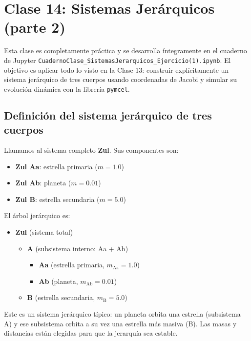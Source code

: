 \chapter{Clase 14: Sistemas Jerárquicos (parte 2)}

Esta clase es completamente práctica y se desarrolla íntegramente en el cuaderno de Jupyter \texttt{CuadernoClase\_SistemasJerarquicos\_Ejercicio(1).ipynb}. El objetivo es aplicar todo lo visto en la Clase 13: construir explícitamente un sistema jerárquico de tres cuerpos usando coordenadas de Jacobi y simular su evolución dinámica con la librería \texttt{pymcel}.

\section{Definición del sistema jerárquico de tres cuerpos}
Llamamos al sistema completo \textbf{Zul}. Sus componentes son:
\begin{itemize}
    \item \textbf{Zul Aa}: estrella primaria (\(m = 1.0\))
    \item \textbf{Zul Ab}: planeta (\(m = 0.01\))
    \item \textbf{Zul B}: estrella secundaria (\(m = 5.0\))
\end{itemize}

El árbol jerárquico es:

\begin{itemize}[leftmargin=2em,label={}]
\item \textbf{Zul} (sistema total)
  \begin{itemize}[leftmargin=2em,label={}]
  \item \textbf{A} (subsistema interno: Aa + Ab)
    \begin{itemize}[leftmargin=2em,label={}]
    \item \textbf{Aa} (estrella primaria, \(m_{\text{Aa}} = 1.0\))
    \item \textbf{Ab} (planeta, \(m_{\text{Ab}} = 0.01\))
    \end{itemize}
  \item \textbf{B} (estrella secundaria, \(m_{\text{B}} = 5.0\))
  \end{itemize}
\end{itemize}

\begin{importante}
Este es un sistema jerárquico típico: un planeta orbita una estrella (subsistema A) y ese subsistema orbita a su vez una estrella más masiva (B). Las masas y distancias están elegidas para que la jerarquía sea estable.
\end{importante}

